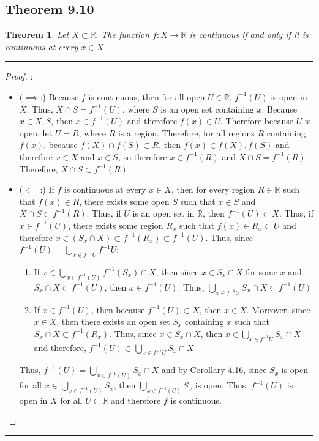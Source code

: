 \documentclass[openany, amssymb, psamsfonts]{amsart}
\newcommand{\bbR}{\mathbb{R}}
\newtheorem{thm}{Theorem}[section]
\theoremstyle{definition}
\numberwithin{equation}{section}
\begin{document}
\subsection*{Theorem 9.10}
\begin{thm}\label{reformulation}
\label{9.10}
Let $X\subset \bbR.$ The function $f\colon X\to \bbR$ is continuous if and only if it is continuous at every $x\in X$.
\end{thm}
\vspace{4pt}     \hrule   \vspace{4pt}
\begin{proof} :\\
\begin{itemize}
    \item ($\implies$:) Because $f$ is continuous, then for all open $U \in \bbR$, $f^{-1}(U)$ is open in $X$. Thus, $X \cap S = f^{-1}(U)$, where $S$ is an open set containing $x$. Because $x\in X,S$, then $x\in f^{-1}(U)$ and therefore $f(x) \in U$. Therefore because $U$ is open, let $U = R$, where $R$ is a region. Therefore, for all regions $R$ containing $f(x)$, because $f(X) \cap f(S) \subset R$, then $f(x) \in f(X),f(S)$ and therefore $x\in X$ and $x\in S$, so therefore $x\in f^{-1}(R)$ and $X\cap S = f^{-1}(R)$. Therefore, $X\cap S \subset f^{-1}(R)$ 
    \item ($\impliedby$:) If $f$ is continuous at every $x\in X$, then for every region $R\in \bbR$ such that $f(x)\in R$, there exists some open $S$ such that $x\in S$ and $X\cap S \subset f^{-1}(R)$. Thus, if $U$ is an open set in $\bbR$, then $f^{-1}(U) \subset X$. Thus, if $x\in f^{-1}(U)$, there exists some region $R_x$ such that $f(x) \in R_x \subset U$ and therefore $x \in (S_x \cap X) \subset f^{-1}(R_x) \subset f^{-1}(U)$. Thus, since $f^{-1}(U) = \bigcup_{x \in f^{-1}U}f^{-1}U$:
    \begin{enumerate}
        \item If $x\in \bigcup_{x\in f^{-1}(U)}f^{-1}(S_x) \cap X$, then since $x\in S_x\cap X$ for some $x$ and $S_x\cap X \subset f^{-1}(U)$, then $x\in f^{-1}(U)$. Thus, $\bigcup_{x\in f^{-1}U}S_x\cap X \subset f^{-1}(U)$
        \item If $x\in f^{-1}(U)$, then because $f^{-1}(U) \subset X$, then $x\in X$. Moreover, since $x\in X$, then there exists an open set $S_x$ containing $x$ such that $S_x\cap X \subset f^{-1}(R_x)$. Thus, since $x\in S_x\cap X$, then $x\in \bigcup_{x\in f^{-1}U} S_x\cap X$ and therefore, $f^{-1}(U) \subset \bigcup_{x\in f^{-1}U}S_x\cap X$
    \end{enumerate}
    Thus, $f^{-1}(U) = \bigcup_{x\in f^{-1}(U)}S_x\cap X$ and by Corollary 4.16, since $S_x$ is open for all $x \in \bigcup_{x\in f^{-1}(U)}S_x$, then $\bigcup_{x\in f^{-1}(U)}S_x$ is open. Thus, 
    $f^{-1}(U)$ is open in $X$ for all $U\subset \bbR$ and therefore $f$ is continuous.  
\end{itemize}
\end{proof} \vspace{4pt}     \hrule   \vspace{4pt}
\end{document}
